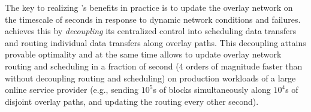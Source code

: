 

The key to realizing \name's benefits in practice is to update
the overlay network on the timescale of seconds in response to dynamic network conditions
and failures. \name achieves this by {\em decoupling} its centralized control
into scheduling data transfers and
routing individual data transfers along overlay paths.
This decoupling attains provable optimality and at the same time
allows \name to update overlay network routing and scheduling in
a fraction of second (4 orders of magnitude faster than without decoupling
routing and scheduling) on production workloads
of a large online service provider (e.g., sending $10^5$s of blocks
simultaneously along $10^4$s of disjoint overlay paths, and updating
the routing every other second).


